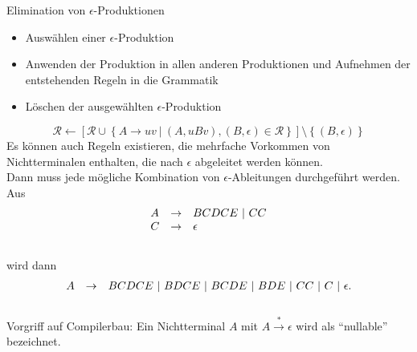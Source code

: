 \documentclass[]{beamer}
\begin{document}
\begin{frame}[squeeze]{}
  \vspace*{-0.25em}
  \begin{block}{Elimination von $\epsilon$-Produktionen}
    \begin{itemize}
      \item Auswählen einer $\epsilon$-Produktion
      \item Anwenden der Produktion in allen anderen Produktionen und Aufnehmen der entstehenden Regeln in die Grammatik
      \item Löschen der ausgewählten $\epsilon$-Produktion
    \end{itemize}
    \[\mathcal{R} \leftarrow \left[ \mathcal{R} \cup \left\{ A \to uv \ | \ \left(A, uBv \right), \left( B, \epsilon\right) \in \mathcal{R} \right\} \right] \setminus \left\{ \left( B, \epsilon \right) \right\} \]
    \pause
    Es können auch Regeln existieren, die mehrfache Vorkommen von Nichtterminalen enthalten, die nach $\epsilon$ abgeleitet werden können. \\
    Dann muss jede mögliche Kombination von $\epsilon$-Ableitungen durchgeführt werden. \pause Aus
    \[\begin{array}{l c l}
        A & \rightarrow & BCDCE \ | \ CC \\
        C & \rightarrow & \epsilon \\
      \end{array}\] \\
    \vspace*{-0.75em}
    wird dann
    \[\begin{array}{l c l}
        A & \rightarrow & BCDCE \ | \ BDCE \ | \ BCDE \ | \ BDE \ | \ CC \ | \ C \ | \ \epsilon. \\
      \end{array}\] \\
    \pause
    \vspace*{-0.5em}
    Vorgriff auf Compilerbau: Ein Nichtterminal $A$ mit $A \overset{\ast}{\to} \epsilon$ wird als \enquote{nullable} bezeichnet.
  \end{block}
\end{frame}
\end{document}
